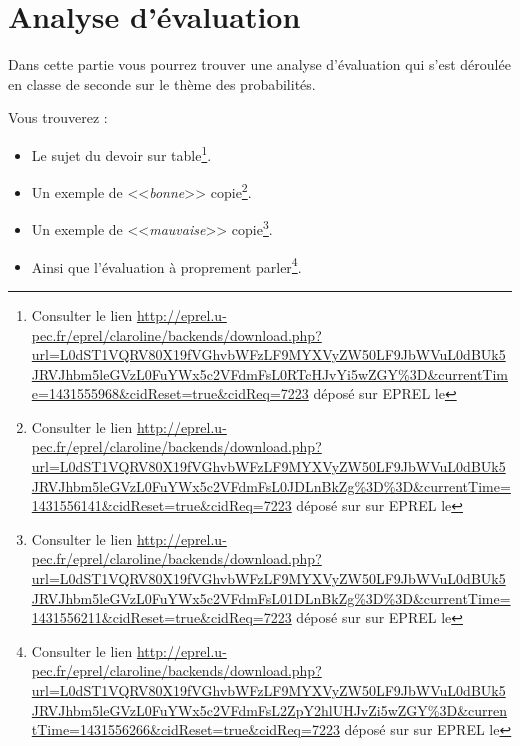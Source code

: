 \chapter{Analyse d'évaluation}

Dans cette partie vous pourrez trouver une analyse d'évaluation qui
s'est déroulée en classe de seconde sur le thème des
probabilités.

Vous trouverez :
\begin{itemize}
\item Le sujet du devoir sur table\footnote{Consulter le lien
    \url{http://eprel.u-pec.fr/eprel/claroline/backends/download.php?url=L0dST1VQRV80X19fVGhvbWFzLF9MYXVyZW50LF9JbWVuL0dBUk5JRVJhbm5leGVzL0FuYWx5c2VFdmFsL0RTcHJvYi5wZGY\%3D\&currentTime=1431555968\&cidReset=true\&cidReq=7223}
    déposé sur EPREL le \date{13 mai 2015}}.
\item Un exemple de <<\textit{bonne}>> copie\footnote{Consulter le
    lien \url{http://eprel.u-pec.fr/eprel/claroline/backends/download.php?url=L0dST1VQRV80X19fVGhvbWFzLF9MYXVyZW50LF9JbWVuL0dBUk5JRVJhbm5leGVzL0FuYWx5c2VFdmFsL0JDLnBkZg\%3D\%3D\&currentTime=1431556141\&cidReset=true\&cidReq=7223} déposé sur sur EPREL le \date{13 mai 2015}}.
\item Un exemple de <<\textit{mauvaise}>> copie\footnote{Consulter le
    lien \url{http://eprel.u-pec.fr/eprel/claroline/backends/download.php?url=L0dST1VQRV80X19fVGhvbWFzLF9MYXVyZW50LF9JbWVuL0dBUk5JRVJhbm5leGVzL0FuYWx5c2VFdmFsL01DLnBkZg\%3D\%3D\&currentTime=1431556211\&cidReset=true\&cidReq=7223} déposé sur sur EPREL le \date{13 mai 2015}}.
\item Ainsi que l'évaluation à proprement parler\footnote{Consulter le
    lien \url{http://eprel.u-pec.fr/eprel/claroline/backends/download.php?url=L0dST1VQRV80X19fVGhvbWFzLF9MYXVyZW50LF9JbWVuL0dBUk5JRVJhbm5leGVzL0FuYWx5c2VFdmFsL2ZpY2hlUHJvZi5wZGY\%3D\&currentTime=1431556266\&cidReset=true\&cidReq=7223} déposé sur sur EPREL le \date{13 mai 2015}}.
\end{itemize}
